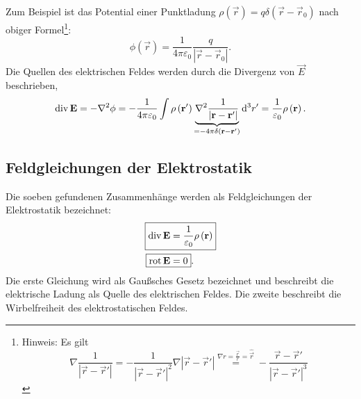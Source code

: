 Zum Beispiel ist das Potential einer Punktladung $\rho \left(\vec {r}\right)=q\delta \left(\vec {r}-\vec {r}_{0}\right)$ nach obiger Formel\footnote{Hinweis: Es gilt
	\begin{equation*}
		\nabla \frac{1}{\left| \vec {r}-\vec {r}\mathrm{'}\right| }=-\frac{1}{\left| \vec {r}-\vec {r}\mathrm{'}\right| ^{2}}\nabla \left| \vec {r}-\vec {r}\mathrm{'}\right| \overset{\nabla r=\frac{\vec {r}}{r}=\hat{\vec {r}}}{=}-\frac{\vec {r}-\vec {r}\mathrm{'}}{\left| \vec {r}-\vec {r}\mathrm{'}\right| ^{3}}
	\end{equation*}
}:
\begin{equation*}
	\phi \left(\vec {r}\right)=\frac{1}{4\pi \varepsilon _{0}}\frac{q}{\left| \vec {r}-\vec {r}_{0}\right| }.
\end{equation*}
Die Quellen des elektrischen Feldes werden durch die Divergenz von $\vec E$ beschrieben,
\begin{equation*}
	\operatorname{div} \mathbf{E}=-\nabla ^{2}\phi =-\frac{1}{4\pi \varepsilon _{0}}\int \rho \left(\mathbf{r}\mathrm{'}\right)\underset{=-4\pi \delta \left(\mathbf{r}-\mathbf{r}\mathrm{'}\right)}{\underbrace{\nabla ^{2}\frac{1}{\left| \mathbf{r}-\mathbf{r}\mathrm{'}\right| }}}\mathop{}\!\mathrm{d} ^{3}r\mathrm{'}=\frac{1}{\varepsilon _{0}}\rho \left(\mathbf{r}\right).
\end{equation*}


\subsection{Feldgleichungen der Elektrostatik}

Die soeben gefundenen Zusammenhänge werden als Feldgleichungen der Elektrostatik bezeichnet:
\begin{align}
	\label{3.4}
	\Aboxed{\divg \vec {E} & =\frac{1}{\varepsilon _{0}}\rho \left(\vec {r}\right)} \\
	\label{3.5}
	\Aboxed{\rot \vec {E}  & =0}.
\end{align}
Die erste Gleichung wird als Gaußsches Gesetz bezeichnet und beschreibt die elektrische Ladung als Quelle des elektrischen Feldes. Die zweite beschreibt die Wirbelfreiheit des elektrostatischen Feldes.

